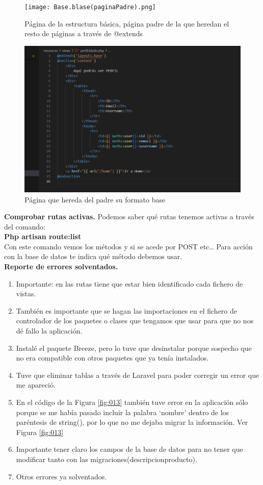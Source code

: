 \documentclass{article}
\begin{document}
\begin{figure}[!]
\centering
\texttt{[image: Base.blase(paginaPadre).png]}
\caption{\label{fig:017} Página de la estructura básica, página padre de la que heredan el resto de páginas a través de @extends}
\end{figure}

\begin{figure}[!]
\centering
\includegraphics[width=12cm]{PerfilLogado(páginaHijo).png}
\caption{\label{fig:018} Página que hereda del padre su formato base}
\end{figure}

\textbf{Comprobar rutas activas.}
Podemos saber qué rutas tenemos activas a través del comando:\\

\textbf{Php artisan route:list}\\

Con este comando vemos los métodos y si se acede por POST etc… Para acción con la base de datos te indica qué método debemos usar.\\

\textbf{Reporte de errores solventados.}
\begin{enumerate}
    \item Importante: en las rutas tiene que estar bien identificado cada fichero de vistas.
    \item También es importante que se hagan las importaciones en el fichero de controlador de los paquetes o clases que tengamos que usar para que no nos dé fallo la aplicación.
    \item Instalé el paquete Breeze, pero lo tuve que desinstalar porque sospecho que no era compatible con otros paquetes que ya tenía instalados.
    \item Tuve que eliminar tablas a través de Laravel para poder corregir un error que me apareció.
    \item En el código de la Figura \ref{fig:013} también tuve error en la aplicación sólo porque se me había pasado incluir la palabra ‘nombre’ dentro de los paréntesis de string(), por lo que no me dejaba migrar la información. Ver Figura \ref{fig:013}

    \item Importante tener claro los campos de la base de datos para no tener que modificar tanto con las migraciones(descripcionproducto).
    \item Otros errores ya solventados.
\end{enumerate}
\end{document}
